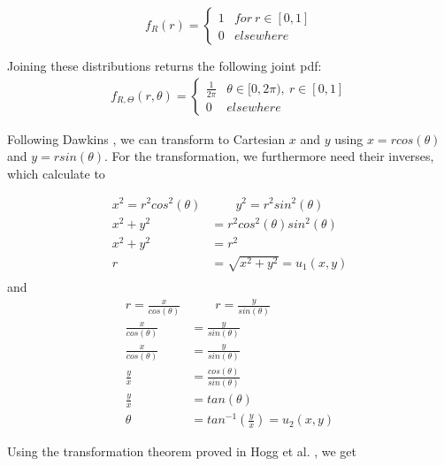 \begin{equation}
f_R(r) = 
\begin{cases} 
      1 & for~r\in[0,1]\\
      0&elsewhere
   \end{cases}
\label{eq:r_untransformed}
\end{equation}

Joining these distributions returns the following joint pdf:
\begin{equation}
\begin{split}
f_{R,\Theta}(r,\theta) = 
\begin{cases} 
      \frac{1}{2\pi} & \theta \in [0,2\pi),~ r\in[0,1]\\
      0&elsewhere
   \end{cases}
\end{split}
\label{eq:joint_pdf_untransformed}
\end{equation}

Following Dawkins \cite{dawkins}, we can transform to Cartesian $x$ and $y$ using $x = rcos(\theta)$ and $y=rsin(\theta)$. For the transformation, we furthermore need their inverses, which calculate to 

\begin{align*}
x^2=r^2cos^2(\theta)& \qquad y^2=r^2sin^2(\theta)\\
x^2+y^2&=r^2cos^2(\theta)sin^2(\theta)\\
x^2+y^2&=r^2\\
r &= \sqrt{x^2+y^2} = u_1(x,y)\\
\label{eq:r-1}
\end{align*}
and
\begin{align*}
 r = \frac{x}{cos(\theta)}& \qquad r = \frac{y}{sin(\theta)}\\
 \frac{x}{cos(\theta)} &= \frac{y}{sin(\theta)}\\
 \frac{x}{cos(\theta)} &= \frac{y}{sin(\theta)}\\
 \frac{y}{x} &= \frac{cos(\theta)}{sin(\theta)}\\
 \frac{y}{x} &= tan(\theta)\\
 \theta &= tan^{-1}(\frac{y}{x}) = u_2(x,y)
\label{eq:theta-1}
\end{align*}

Using the transformation theorem proved in Hogg et al. \cite[Chapter~2.7]{hogg}, we get
 
